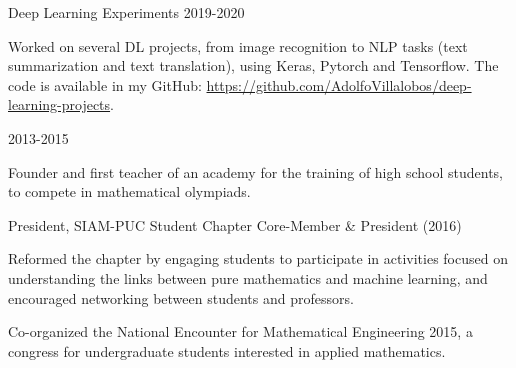 
\begin{cventries}
  \cventry
  {Deep Learning Experiments}
  {}
  {}
  {2019-2020}{
  \begin{cvitems}
   \item {Worked on several DL projects, from image recognition to NLP tasks (text summarization and text translation), using
   Keras, Pytorch and Tensorflow. The code is available in my GitHub: \url{https://github.com/AdolfoVillalobos/deep-learning-projects}.}
  \end{cvitems}
   }



\end{cventries}

\begin{cventries}
  {}
  {}
  {2013-2015}
  {\begin{cvitems}
    \item {Founder and first teacher of an academy for the training of high school students, to compete in mathematical olympiads.}
  \end{cvitems}
}
  \cventry
  {President, SIAM-PUC Student Chapter}
  {}
  {}
  {Core-Member \& President (2016)}
  {
    \begin{cvitems}
      \item {Reformed the chapter by engaging students to participate in activities focused 
        on understanding the links between pure mathematics and machine learning,
        and encouraged networking between students and professors.}
      \item {Co-organized the National Encounter for Mathematical Engineering 2015, a congress for undergraduate students interested in applied mathematics.}
    \end{cvitems}
    }
\end{cventries}

 

